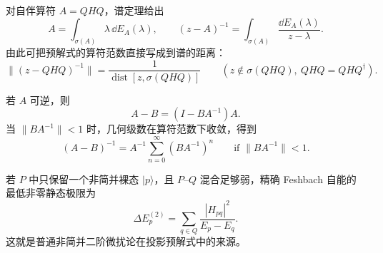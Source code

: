 
对自伴算符 $A=QHQ$，谱定理给出
\begin{equation}
 {
 A=\int_{\sigma(A)}\lambda\,\dd E_A(\lambda),
 \qquad
 (z-A)^{-1}=\int_{\sigma(A)}\frac{\dd E_A(\lambda)}{z-\lambda}.}
 \label{eq:resolvent-spectral-resolution-dp68}
\end{equation}
由此可把预解式的算符范数直接写成到谱的距离：
\begin{equation}
{
\|(z-QHQ)^{-1}\|
=\frac1{\operatorname{dist}[z,\sigma(QHQ)]}}
\qquad
(z\notin\sigma(QHQ),\ QHQ=QHQ^\dagger).
\label{eq:resolvent-norm-spectral-dp21}
\end{equation}

若 $A$ 可逆，则
\begin{equation}
 {A-B=(I-BA^{-1})A.}
 \label{eq:neumann-factorization-dp68}
\end{equation}
当 $\|BA^{-1}\|<1$ 时，几何级数在算符范数下收敛，得到
\begin{equation}
{
(A-B)^{-1}=A^{-1}\sum_{n=0}^{\infty}(BA^{-1})^n}
\qquad
\text{if }\|BA^{-1}\|<1.
\label{eq:operator-neumann-resolvent-dp21}
\end{equation}

若 $P$ 中只保留一个非简并裸态 $|p\rangle$，且 $P$--$Q$ 混合足够弱，精确 Feshbach 自能的最低非零静态极限为
\begin{equation}
 {
 \Delta E_p^{(2)}
 =\sum_{q\in Q}
 \frac{|H_{pq}|^2}{E_p-E_q}.}
 \label{eq:feshbach-second-order-static-dp68}
\end{equation}
这就是普通非简并二阶微扰论在投影预解式中的来源。
